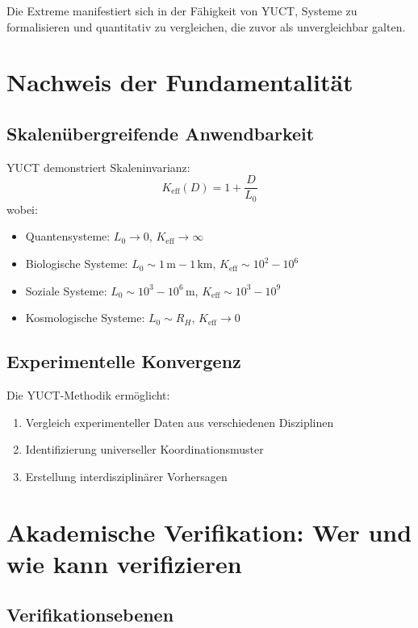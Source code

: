 \documentclass[12pt,a4paper]{article}
\begin{document}
	Die Extreme manifestiert sich in der Fähigkeit von YUCT, Systeme zu formalisieren und quantitativ zu vergleichen, die zuvor als unvergleichbar galten.
	
	\section{Nachweis der Fundamentalität}
	
	\subsection{Skalenübergreifende Anwendbarkeit}
	
	YUCT demonstriert Skaleninvarianz:
	\[
	K_{\mathrm{eff}}(D) = 1 + \frac{D}{L_0}
	\]
	wobei:
	\begin{itemize}
		\item Quantensysteme: $L_0 \to 0$, $K_{\mathrm{eff}} \to \infty$
		\item Biologische Systeme: $L_0 \sim 1\,\mathrm{m}-1\,\mathrm{km}$, $K_{\mathrm{eff}} \sim 10^2-10^6$
		\item Soziale Systeme: $L_0 \sim 10^3-10^6\,\mathrm{m}$, $K_{\mathrm{eff}} \sim 10^3-10^9$
		\item Kosmologische Systeme: $L_0 \sim R_H$, $K_{\mathrm{eff}} \to 0$
	\end{itemize}
	
	\subsection{Experimentelle Konvergenz}
	
	Die YUCT-Methodik ermöglicht:
	\begin{enumerate}
		\item Vergleich experimenteller Daten aus verschiedenen Disziplinen
		\item Identifizierung universeller Koordinationsmuster
		\item Erstellung interdisziplinärer Vorhersagen
	\end{enumerate}
	
	\section{Akademische Verifikation: Wer und wie kann verifizieren}
	
	\subsection{Verifikationsebenen}
	
\end{document}
